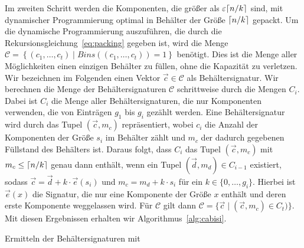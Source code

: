 Im zweiten Schritt werden die Komponenten, die größer als $\varepsilon \lceil n/k\rceil$ sind, mit dynamischer Programmierung optimal in Behälter der Größe $\lceil n/k\rceil$ gepackt.
Um die dynamische Programmierung auszuführen, die durch die Rekursionsgleichung~\eqref{eq:packing} gegeben ist, wird die Menge $\mathcal{C} = \left\{ (c_1, \ldots, c_t) \mid Bins((c_1, \ldots, c_t)) = 1 \right\}$ benötigt.
Dies ist die Menge aller Möglichkeiten einen einzigen Behälter zu füllen, ohne die Kapazität zu verletzen.
Wir bezeichnen im Folgenden einen Vektor $\vec{c} \in \mathcal{C}$ als Behältersignatur.
Wir berechnen die Menge der Behältersignaturen $\mathcal{C}$ schrittweise durch die Mengen $C_i$.
Dabei ist $C_i$ die Menge aller Behältersignaturen, die nur Komponenten verwenden, die von Einträgen $g_1$ bis $g_i$ gezählt werden.
Eine Behältersignatur wird durch das Tupel $(\vec{c}, m_c)$ repräsentiert, wobei $c_i$ die Anzahl der Komponenten der Größe $s_i$ im Behälter zählt und $m_c$ der dadurch gegebenen Füllstand des Behälters ist.
Daraus folgt, dass $C_i$ das Tupel $(\vec{c}, m_c)$ mit $m_c \leq \lceil n/k\rceil$ genau dann enthält, wenn ein Tupel $(\vec{d}, m_d) \in C_{i-1}$ existiert, sodass $\vec{c} = \vec{d} + k \cdot \vec{e}(s_i)$ und $m_c = m_d + k \cdot s_i$ für ein $k \in \{0, \ldots, g_i\}$.
Hierbei ist $\vec{e}(x)$ die Signatur, die nur eine Komponente der Größe $x$ enthält und deren erste Komponente weggelassen wird.
Für $\mathcal{C}$ gilt dann $\mathcal{C} = \{ \vec{c} \mid (\vec{c}, m_c) \in C_t)\}$.
Mit diesen Ergebnissen erhalten wir Algorithmus~\ref{alg:cabisi}.

\begin{algorithm}
    \caption{Ermitteln der Behältersignaturen mit }
    \label{alg:cabisi}
    \begin{algorithmic}[1]
                 
                       \EndIf
                    \EndFor
                \EndFor
            \EndFor
        \EndFunction
    \end{algorithmic}
\end{algorithm}

